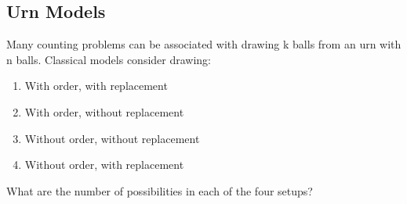 \documentclass{article}
\begin{document}
	\subsection{Urn Models}
	Many counting problems can be associated with drawing k balls from an urn with n balls. Classical models consider drawing:
	\begin{enumerate}[label=(\Roman*)]
		\item With order, with replacement
		\item With order, without replacement
		\item Without order, without replacement
		\item Without order, with replacement
	\end{enumerate}
	
	What are the number of possibilities in each of the four setups?
\end{document}
